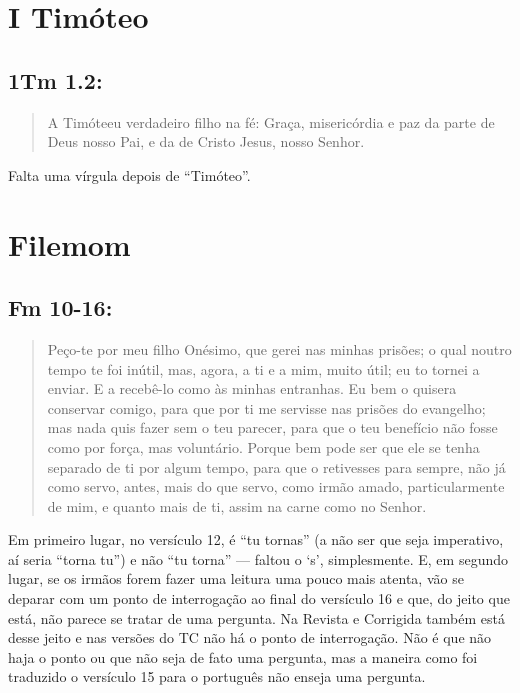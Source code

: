 \section{I Timóteo}
\subsection*{1Tm 1.2:}
\begin{quote}
    \small
A Timóteeu verdadeiro filho na fé: Graça, misericórdia e paz da parte de Deus nosso Pai, e da de Cristo Jesus, nosso Senhor.
\end{quote}

Falta uma vírgula depois de ``Timóteo''.

\section{Filemom}
\subsection*{Fm 10-16:}
\begin{quote}
    \small
Peço-te por meu filho Onésimo, que gerei nas minhas prisões; o qual noutro tempo te foi inútil, mas, agora, a ti e a mim, muito útil; eu to tornei a enviar. E  a recebê-lo como às minhas entranhas. Eu bem o quisera conservar comigo, para que por ti me servisse nas prisões do evangelho; mas nada quis fazer sem o teu parecer, para que o teu benefício não fosse como por força, mas voluntário. Porque bem pode ser que ele se tenha separado de ti por algum tempo, para que o retivesses para sempre, não já como servo, antes, mais do que servo, como irmão amado, particularmente de mim, e quanto mais de ti, assim na carne como no Senhor.
\end{quote}

Em primeiro lugar, no versículo 12, é ``tu tornas'' (a não ser que seja imperativo, aí seria ``torna tu'') e não ``tu torna'' --- faltou o `s', simplesmente. E, em segundo lugar, se os irmãos forem fazer uma leitura uma pouco mais atenta, vão se deparar com um ponto de interrogação ao final do versículo 16 e que, do jeito que está, não parece se tratar de uma pergunta. Na Revista e Corrigida também está
desse jeito e nas versões do TC não há o ponto de interrogação. Não é que não haja o ponto ou que não seja de fato uma pergunta, mas a maneira como foi traduzido o versículo 15 para o português não enseja uma pergunta.

